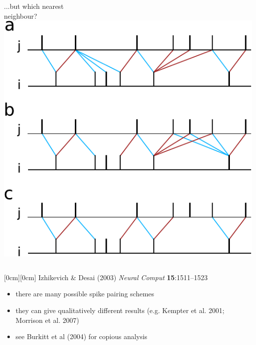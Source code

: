 \documentclass{beamer}
\begin{document}
\begin{frame}
\begin{columns}[T]
    \hspace*{3mm}...but which nearest\\\hspace*{5mm} neighbour?
    \includegraphics[width=\textwidth]{./figures/spike_pairing}
\end{columns}
\raisebox{0.5cm}[0cm][0cm]{%
        \tiny{Izhikevich \& Desai (2003) \textit{Neural Comput} \textbf{15}:1511--1523}
    }
\begin{itemize}
\item there are many possible spike pairing schemes
\item they can give qualitatively different results {\scriptsize{(e.g. Kempter et al. 2001; Morrison et al. 2007)}}
\item see Burkitt et al (2004) for copious analysis
\end{itemize}
\end{frame}
\end{document}
